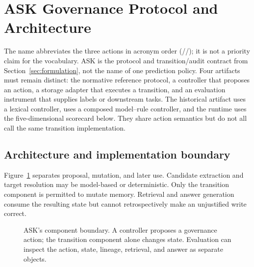\section{ASK Governance Protocol and Architecture}
\label{sec:method}

The name \ask{} abbreviates the three actions in acronym order
(\abstain/\supersede/\keep); it is not a priority claim for the vocabulary.
ASK is the protocol and transition/audit contract from
Section~\ref{sec:formulation}, not the name of one prediction policy. Four
artifacts must remain distinct: the normative reference protocol, a controller
that proposes an action, a storage adapter that executes a transition, and an
evaluation instrument that supplies labels or downstream tasks. The historical
\mgp{} artifact uses a lexical controller, \mgpc{} uses a composed model--rule
controller, and the \lme{} runtime uses the five-dimensional scorecard below.
They share action semantics but do not all call the same transition
implementation.

\subsection{Architecture and implementation boundary}
\label{sec:architecture}

Figure~\ref{fig:ask-architecture} separates proposal, mutation, and later use.
Candidate extraction and target resolution may be model-based or deterministic.
Only the transition component is permitted to mutate memory. Retrieval and
answer generation consume the resulting state but cannot retrospectively make
an unjustified write correct.

\begin{figure}[!h]
\centering
{}
\caption{ASK's component boundary. A controller proposes a governance action;
the transition component alone changes state. Evaluation can inspect the action,
state, lineage, retrieval, and answer as separate objects.}
\label{fig:ask-architecture}
\end{figure}

